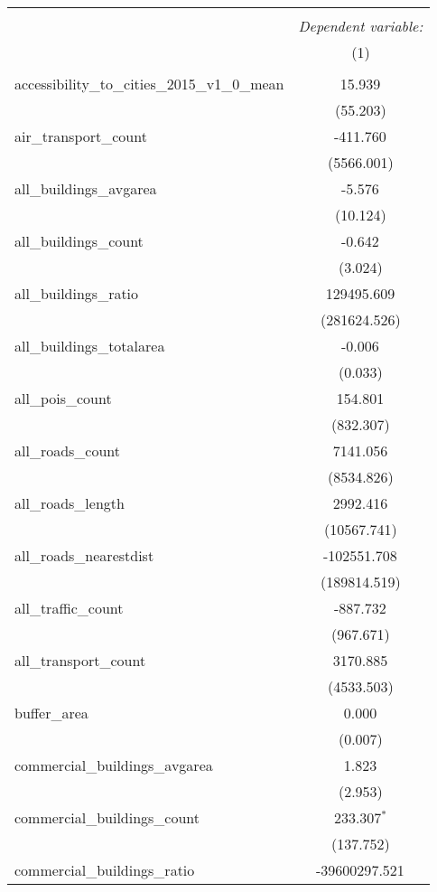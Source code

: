 \begin{table}[!htbp] \centering
\begin{tabular}{@{\extracolsep{5pt}}lc}
\\[-1.8ex]\hline
\hline \\[-1.8ex]
& \multicolumn{1}{c}{\textit{Dependent variable:}} \
\cr \cline{1-2}
\\[-1.8ex] & (1) \\
\hline \\[-1.8ex]
 accessibility_to_cities_2015_v1_0_mean & 15.939$^{}$ \\
  & (55.203) \\
 air_transport_count & -411.760$^{}$ \\
  & (5566.001) \\
 all_buildings_avgarea & -5.576$^{}$ \\
  & (10.124) \\
 all_buildings_count & -0.642$^{}$ \\
  & (3.024) \\
 all_buildings_ratio & 129495.609$^{}$ \\
  & (281624.526) \\
 all_buildings_totalarea & -0.006$^{}$ \\
  & (0.033) \\
 all_pois_count & 154.801$^{}$ \\
  & (832.307) \\
 all_roads_count & 7141.056$^{}$ \\
  & (8534.826) \\
 all_roads_length & 2992.416$^{}$ \\
  & (10567.741) \\
 all_roads_nearestdist & -102551.708$^{}$ \\
  & (189814.519) \\
 all_traffic_count & -887.732$^{}$ \\
  & (967.671) \\
 all_transport_count & 3170.885$^{}$ \\
  & (4533.503) \\
 buffer_area & 0.000$^{}$ \\
  & (0.007) \\
 commercial_buildings_avgarea & 1.823$^{}$ \\
  & (2.953) \\
 commercial_buildings_count & 233.307$^{*}$ \\
  & (137.752) \\
 commercial_buildings_ratio & -39600297.521$^{}$ \\

\end{tabular}
\end{table}
